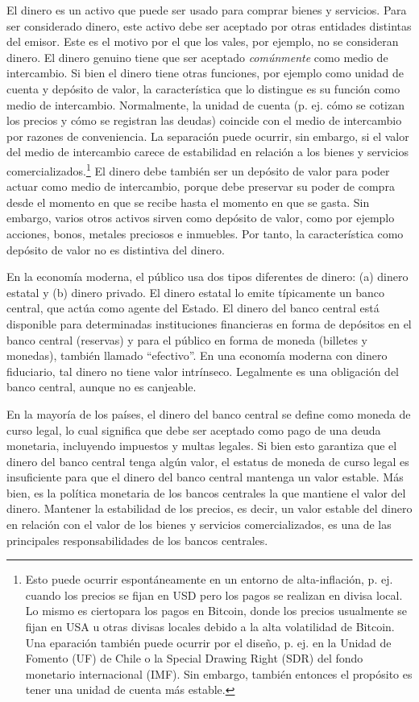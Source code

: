 \documentclass[10pt,spanish]{article}
\begin{document}
El dinero es un activo que puede ser usado para comprar bienes y
servicios. Para ser considerado dinero, este activo debe ser aceptado
por otras entidades distintas del emisor. Este es el motivo por el que
los vales, por ejemplo, no se consideran dinero. El dinero genuino tiene
que ser aceptado \emph{comúnmente} como medio de intercambio. Si bien el
dinero tiene otras funciones, por ejemplo como unidad de cuenta y
depósito de valor, la característica que lo distingue es su función como
medio de intercambio. Normalmente, la unidad de cuenta (p. ej. cómo se
cotizan los precios y cómo se registran las deudas) coincide con el
medio de intercambio por razones de conveniencia. La separación puede
ocurrir, sin embargo, si el valor del medio de intercambio carece de
estabilidad en relación a los bienes y servicios
comercializados.\footnote{Esto puede ocurrir espontáneamente en un entorno
de alta-inflación, p. ej. cuando los precios se fijan en USD pero los pagos
se realizan en divisa local. Lo mismo es ciertopara los pagos en Bitcoin,
donde los precios usualmente se fijan en USA u otras divisas locales debido a
la alta volatilidad de Bitcoin. Una eparación también puede ocurrir por el
diseño, p. ej. en la Unidad de Fomento (UF) de Chile o la Special Drawing Right
(SDR) del fondo monetario internacional (IMF). Sin embargo, también entonces el
propósito es tener una unidad de cuenta más estable.} El dinero debe también ser
un depósito de valor para poder actuar como medio de intercambio, porque
debe preservar su poder de compra desde el momento en que se recibe
hasta el momento en que se gasta. Sin embargo, varios otros activos
sirven como depósito de valor, como por ejemplo acciones, bonos, metales
preciosos e inmuebles. Por tanto, la característica como depósito de
valor no es distintiva del dinero.

En la economía moderna, el público usa dos tipos diferentes de dinero:
(a) dinero estatal y (b) dinero privado. El dinero estatal lo emite
típicamente un banco central, que actúa como agente del Estado. El
dinero del banco central está disponible para determinadas instituciones
financieras en forma de depósitos en el banco central (reservas) y para
el público en forma de moneda (billetes y monedas), también llamado
``efectivo''. En una economía moderna con dinero fiduciario, tal dinero
no tiene valor intrínseco. Legalmente es una obligación del banco
central, aunque no es canjeable.

En la mayoría de los países, el dinero del banco central se define como
moneda de curso legal, lo cual significa que debe ser aceptado como pago
de una deuda monetaria, incluyendo impuestos y multas legales. Si bien
esto garantiza que el dinero del banco central tenga algún valor, el
estatus de moneda de curso legal es insuficiente para que el dinero del
banco central mantenga un valor estable. Más bien, es la política
monetaria de los bancos centrales la que mantiene el valor del dinero.
Mantener la estabilidad de los precios, es decir, un valor estable del
dinero en relación con el valor de los bienes y servicios
comercializados, es una de las principales responsabilidades de los
bancos centrales.
\end{document}

